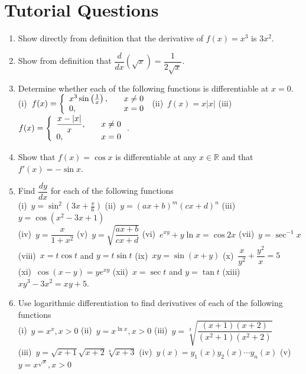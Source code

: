 \documentclass[titlepage,a4paper,12pt]{report}
\begin{document}
\section{Tutorial Questions}
\begin{enumerate}
\item Show directly from definition that the derivative of $f(x)=x^3$ is $3x^2$.
\item Show from definition that $\dfrac{d}{dx}(\sqrt{x})=\dfrac{1}{2\sqrt{x}}$.
\item Determine whether each of the following functions is differentiable at $x=0$.\\
(i)\,  $f(x) = \left\{ 
\begin{array}{l l}
  x^3\sin \left(\frac{1}{x}\right), & \quad x\neq 0\\
  0, & \quad x=0\\ \end{array} \right.$ \quad (ii)\, $f(x)=x|x|$ \quad (iii)\,  $f(x) = \left\{ 
\begin{array}{l l}
  \dfrac{x-|x|}{x}, & \quad x\neq 0\\
  0, & \quad x=0\\ \end{array} \right. $.
  \item Show that $f(x)=\cos x$ is differentiable at any $x \in \mathbb{R}$ and that $f'(x)=-\sin x$.
  \item Find $\dfrac{dy}{dx}$ for each of the following functions\\
  (i)\, $y=\sin ^2(3x+\frac{\pi}{6})$ \quad (ii)\, $y=(ax+b)^m(cx+d)^n$ \quad (iii)\, $y=\cos (x^2-3x+1)$ \\
   (iv)\, $y=\dfrac{x}{1+x^2}$ \quad (v)\, $y=\sqrt{\dfrac{ax+b}{cx+d}}$ \quad (vi)\, $e^{xy}+y\ln x=\cos 2x$ \quad (vii)\, $y=\sec ^{-1} x$\\ (viii)\, $x=t\cos t$ and $y=t\sin t$ \quad (ix)\, $xy=\sin (x+y)$ \quad (x)\, $\dfrac{x}{y^2}+\dfrac{y^2}{x}=5$\\ (xi)\, $\cos (x-y)=ye^{xy}$ \quad (xii)\, $x=\sec t$ and $y=\tan t$ \quad (xiii)\, $xy^3-3x^2=xy+5$.
   \item Use logarithmic differentiation to find derivatives of each of the following functions\\
   (i)\, $y=x^x, x>0$ \quad (ii)\, $y=x^{\ln x}, x>0$ \quad (iii)\, $y=\sqrt[3]{\dfrac{(x+1)(x+2)}{(x^2+1)(x^2+2)}}$\\
   (iii)\, $y=\sqrt{x+1}\sqrt{x+2}\sqrt[4]{x+3}$ \quad (iv)\, $y(x)=y_1(x)y_2(x)\cdots y_n(x)$ \quad (v)\, $y=x^{\sqrt{x}}, x>0$\\

\end{enumerate}
\end{document}
